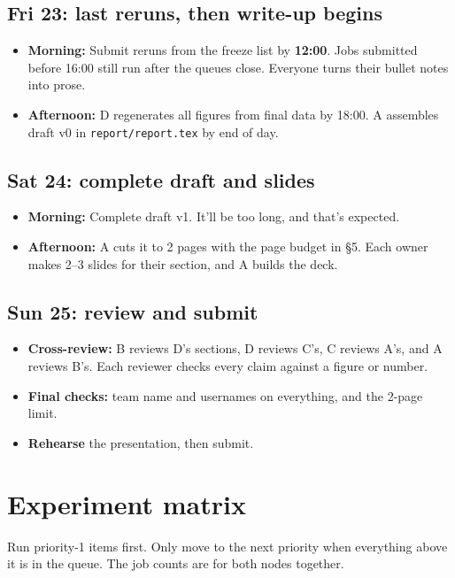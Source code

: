 \documentclass[10pt,a4paper]{article}
\newcommand{\deadline}[1]{\textbf{\color{red!70!black}#1}}
\begin{document}
\subsection*{Fri 23: last reruns, then write-up begins}
\begin{itemize}
  \item \textbf{Morning:} Submit reruns from the freeze list by \deadline{12:00}. Jobs submitted before 16:00 still run after the queues close. Everyone turns their bullet notes into prose.
  \item \textbf{Afternoon:} D regenerates all figures from final data by 18:00. A assembles draft v0 in \texttt{report/report.tex} by end of day.
\end{itemize}

\subsection*{Sat 24: complete draft and slides}
\begin{itemize}
  \item \textbf{Morning:} Complete draft v1. It'll be too long, and that's expected.
  \item \textbf{Afternoon:} A cuts it to 2 pages with the page budget in \S5. Each owner makes 2--3 slides for their section, and A builds the deck.
\end{itemize}

\subsection*{Sun 25: review and submit}
\begin{itemize}
  \item \textbf{Cross-review:} B reviews D's sections, D reviews C's, C reviews A's, and A reviews B's. Each reviewer checks every claim against a figure or number.
  \item \textbf{Final checks:} team name and usernames on everything, and the 2-page limit.
  \item \textbf{Rehearse} the presentation, then submit.
\end{itemize}

\section{Experiment matrix}
Run priority-1 items first. Only move to the next priority when everything above it is in the queue. The job counts are for both nodes together.
\end{document}
